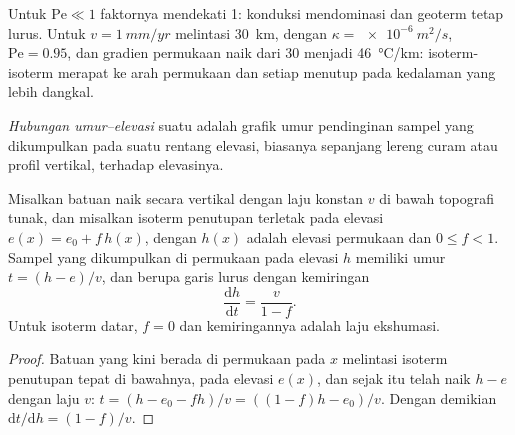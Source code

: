 Untuk $\mathrm{Pe} \ll 1$ faktornya mendekati 1: konduksi mendominasi dan
geoterm tetap lurus. Untuk $v = \qty{1}{mm/yr}$ melintasi \qty{30}{km}, dengan
$\kappa = \qty{e-6}{m^2/s}$, $\mathrm{Pe} = 0.95$, dan gradien permukaan
naik dari 30 menjadi \qty{46}{\celsius/km}: isoterm-isoterm merapat ke
arah permukaan dan setiap  menutup pada kedalaman yang lebih dangkal.

\begin{definition}\label{def:b3:orogenic-wedges:age-elevation}
\emph{Hubungan umur--elevasi} suatu
 adalah grafik umur pendinginan sampel yang dikumpulkan pada suatu
rentang elevasi, biasanya sepanjang lereng curam atau profil vertikal,
terhadap elevasinya.
\end{definition}

\begin{proposition}\label{prop:b3:orogenic-wedges:age-elevation}
Misalkan batuan naik secara vertikal dengan laju konstan $v$ di bawah
topografi tunak, dan misalkan isoterm penutupan terletak pada elevasi $e(x) = e_0 +
f\,h(x)$, dengan $h(x)$ adalah elevasi permukaan dan $0 \le f < 1$. Sampel
yang dikumpulkan di permukaan pada elevasi $h$ memiliki umur $t = (h - e)/v$,
dan  berupa garis lurus dengan kemiringan
\[
  \frac{\mathrm dh}{\mathrm dt} = \frac{v}{1 - f}.
\]
Untuk isoterm datar, $f = 0$ dan kemiringannya adalah laju ekshumasi.
\end{proposition}

\begin{proof}
Batuan yang kini berada di permukaan pada $x$ melintasi isoterm penutupan tepat
di bawahnya, pada elevasi $e(x)$, dan sejak itu telah naik $h - e$ dengan laju $v$:
$t = (h - e_0 - fh)/v = ((1 - f)h - e_0)/v$. Dengan demikian $\mathrm dt/\mathrm dh =
(1 - f)/v$.
\end{proof}

